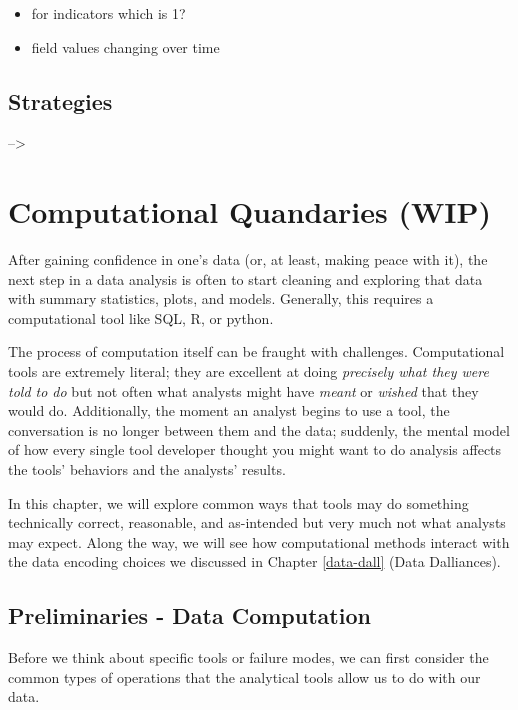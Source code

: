 \documentclass[
]{krantz}
\providecommand{\tightlist}{%
  \setlength{\itemsep}{0pt}\setlength{\parskip}{0pt}}
\begin{document}
\begin{itemize}
\tightlist
\item
  for indicators which is 1?
\item
  field values changing over time
\end{itemize}

\hypertarget{strategies}{%
\section{Strategies}\label{strategies}}

--\textgreater{}

\hypertarget{comp-quan}{%
\chapter{Computational Quandaries (WIP)}\label{comp-quan}}

After gaining confidence in one's data (or, at least, making peace with it), the next step in a data analysis is often to start cleaning and exploring that data with summary statistics, plots, and models.
Generally, this requires a computational tool like SQL, R, or python.

The process of computation itself can be fraught with challenges.
Computational tools are extremely literal; they are excellent at doing \emph{precisely what they were told to do} but not often what analysts might have \emph{meant} or \emph{wished} that they would do.
Additionally, the moment an analyst begins to use a tool, the conversation is no longer between them and the data;
suddenly, the mental model of how every single tool developer thought you might want to do analysis affects the tools' behaviors and the analysts' results.

In this chapter, we will explore common ways that tools may do something technically correct, reasonable, and as-intended but very much not what analysts may expect.
Along the way, we will see how computational methods interact with the data encoding choices we discussed in Chapter \ref{data-dall} (Data Dalliances).

\hypertarget{preliminaries---data-computation}{%
\section{Preliminaries - Data Computation}\label{preliminaries---data-computation}}

Before we think about specific tools or failure modes, we can first consider the common types of operations that the analytical tools allow us to do with our data.
\end{document}
